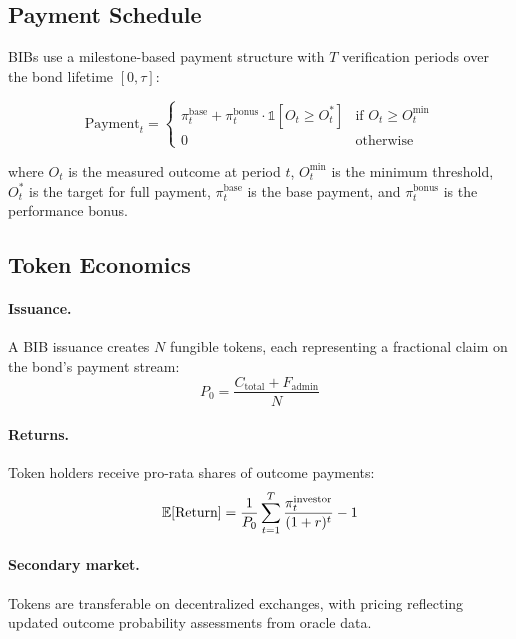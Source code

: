 \subsection{Payment Schedule}

BIBs use a milestone-based payment structure with $T$ verification
periods over the bond lifetime $[0, \tau]$:

\begin{equation}
  \text{Payment}_t = \begin{cases}
    \pi_t^{\text{base}} + \pi_t^{\text{bonus}} \cdot \mathbb{1}[O_t \geq O_t^*]
    & \text{if } O_t \geq O_t^{\min} \\
    0 & \text{otherwise}
  \end{cases}
\end{equation}

where $O_t$ is the measured outcome at period $t$, $O_t^{\min}$ is the
minimum threshold, $O_t^*$ is the target for full payment,
$\pi_t^{\text{base}}$ is the base payment, and $\pi_t^{\text{bonus}}$
is the performance bonus.

\subsection{Token Economics}

\paragraph{Issuance.} A BIB issuance creates $N$ fungible tokens,
each representing a fractional claim on the bond's payment stream:
\begin{equation}
  P_0 = \frac{C_{\text{total}} + F_{\text{admin}}}{N}
\end{equation}

\paragraph{Returns.} Token holders receive pro-rata shares of outcome
payments:
\begin{equation}
  \mathbb{E}[\text{Return}] = \frac{1}{P_0} \sum_{t=1}^{T}
  \frac{\pi_t^{\text{investor}}}{(1+r)^t} - 1
\end{equation}

\paragraph{Secondary market.} Tokens are transferable on decentralized
exchanges, with pricing reflecting updated outcome probability
assessments from oracle data.


